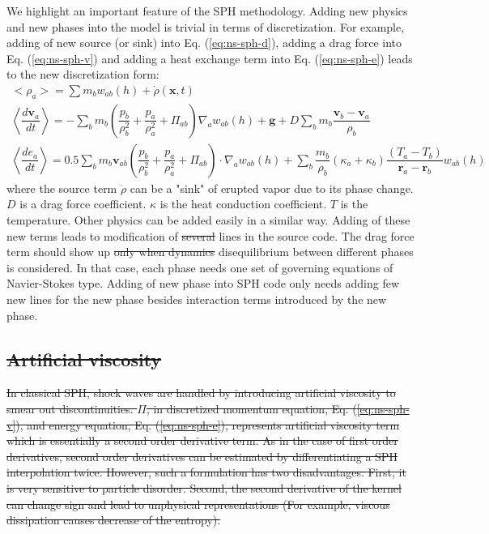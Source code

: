 \documentclass[gmd, manuscript]{copernicus} %
\providecommand{\DIFadd}[1]{{\protect\color{blue}\uwave{#1}}} %
\providecommand{\DIFdel}[1]{{\protect\color{red}\sout{#1}}}                      %
\providecommand{\DIFaddbegin}{} %
\providecommand{\DIFaddend}{} %
\providecommand{\DIFdelbegin}{} %
\providecommand{\DIFdelend}{} %
\begin{document}
We highlight an important feature of the SPH methodology. Adding new physics and new phases into the model is trivial in terms of discretization. For example, adding of new source (or sink) into Eq. (\ref{eq:ns-sph-d}), adding a drag force into Eq. (\ref{eq:ns-sph-v})  and adding a heat exchange term into Eq. (\ref{eq:ns-sph-e}) leads to the new discretization form:
\begin{align}
<\rho_a> = \sum m_b w_{ab} \left(h\right) + \dot{\rho}\left(\textbf{x},t\right)\label{eq:ns-source-sph-d} \\
\left\langle\dfrac{d \textbf{v}_a}{d t}\right\rangle= -\sum_b m_b \left(\dfrac{p_b}{\rho_b^2} + \dfrac{p_a}{\rho_a^2} + \Pi_{ab}\right) \nabla_a w_{a b}\left(h\right) +\textbf{g} + D \sum	_b m_b \dfrac{\textbf{v}_b - \textbf{v}_a}{\rho_b} \label{eq:ns-drag-sph-v} \\
\left\langle\dfrac{d e_a}{d t}\right\rangle=
 0.5\sum_b m_b \textbf{v}_{a b}\left(\dfrac{p_b}{\rho_b^2} + \dfrac{p_a}{\rho_a^2} + \Pi_{ab}\right) \cdot \nabla_a w_{a b}\left(h\right) + \sum_b \dfrac{m_b}{\rho_b}\left(\kappa_a + \kappa_b\right) \dfrac{\left(T_a - T_b\right)}{\textbf{r}_a - \textbf{r}_b} w_{ab}\left(h\right) \label{eq:ns-conduction-sph-e}
\end{align}
where the source term $\dot{\rho}$ can be a "sink" of erupted vapor due to its phase change.
$D$ is a drag force coefficient. $\kappa$ is the heat conduction coefficient. $T$ is the temperature. Other physics can be added easily in a similar way. Adding of these new terms leads to modification of \DIFdelbegin \DIFdel{several }\DIFdelend \DIFaddbegin \DIFadd{only a few }\DIFaddend lines in the source code. The drag force term should show up \DIFdelbegin \DIFdel{only when dynamics }\DIFdelend \DIFaddbegin \DIFadd{when dynamic }\DIFaddend disequilibrium between different phases is considered. In that case, each phase needs one set of governing equations of Navier-Stokes type. Adding of new phase into SPH code only needs adding few new lines for the new phase besides interaction terms introduced by the new phase.

\DIFdelbegin \subsection{\DIFdel{Artificial viscosity}} %
\addtocounter{subsection}{-1}%
\DIFdel{In classical SPH, shock waves are handled by introducing artificial viscosity to smear out discontinuities. $\Pi$, in discretized momentum equation, Eq. (\ref{eq:ns-sph-v}), and energy equation, Eq. (\ref{eq:ns-sph-e}), represents artificial viscosity term which is essentially a second order derivative term. As in the case of first order derivatives, second order derivatives can be estimated by differentiating a SPH interpolation twice. However, such a formulation has two disadvantages: First, it is very sensitive to particle disorder. Second, the second derivative of the kernel can change sign and lead to unphysical representations (For example, viscous dissipation causes decrease of the entropy). 
}%
\end{document}
